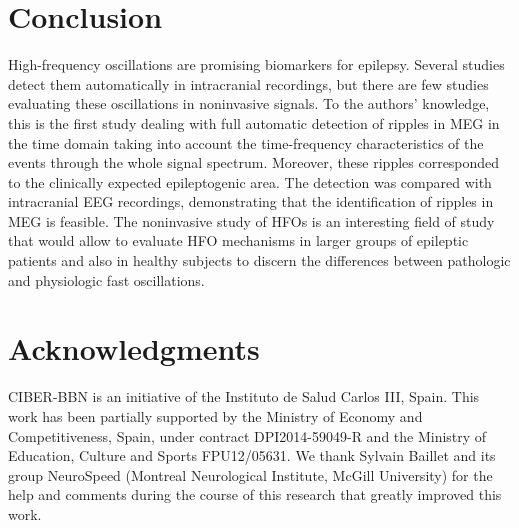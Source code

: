 \section{Conclusion}

High-frequency oscillations are promising biomarkers for epilepsy. Several studies detect them automatically in intracranial recordings, but there are few studies evaluating these oscillations in noninvasive signals. To the authors’ knowledge, this is the first study dealing with full automatic detection of ripples in MEG in the time domain taking into account the time-frequency characteristics of the events through the whole signal spectrum. Moreover, these ripples corresponded to the clinically expected epileptogenic area. The detection was compared with intracranial EEG recordings, demonstrating that the identification of ripples in MEG is feasible. The noninvasive study of HFOs is an interesting field of study that would allow to evaluate HFO mechanisms in larger groups of epileptic patients and also in healthy subjects to discern the differences between pathologic and physiologic fast oscillations. 


\section{Acknowledgments}

CIBER-BBN is an initiative of the Instituto de Salud Carlos III, Spain. This work has been partially supported by the Ministry of Economy and Competitiveness, Spain, under contract DPI2014-59049-R and the Ministry of Education, Culture and Sports FPU12/05631. We thank Sylvain Baillet and its group NeuroSpeed (Montreal Neurological Institute, McGill University) for the help and comments during the course of this research that greatly improved this work. 




